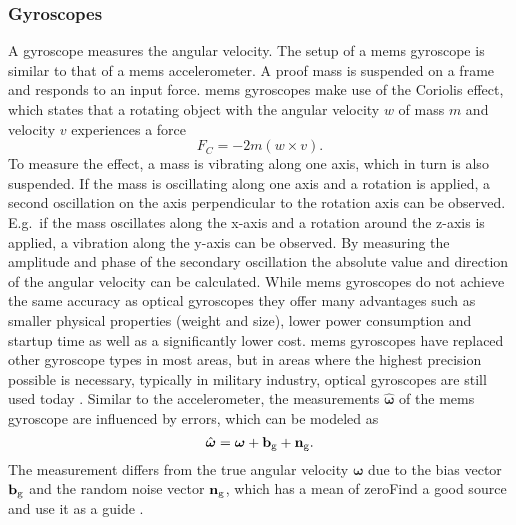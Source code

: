 \subsubsection{ Gyroscopes}
A gyroscope measures the angular velocity.
The setup of a \gls{mems} gyroscope is similar to that of a \gls{mems} accelerometer.
A proof mass is suspended on a frame and responds to an input force.
\gls{mems} gyroscopes make use of the Coriolis effect, which states that a rotating object with the angular velocity $w$ of mass $m$ and velocity $v$ experiences a force
\begin{equation}
    F_C = -2m(w\times v).
\end{equation}
To measure the effect, a mass is vibrating along one axis, which in turn is also suspended.
If the mass is oscillating along one axis and a rotation is applied, a second oscillation on the axis perpendicular to the rotation axis can be observed.
E.g.\ if the mass oscillates along the x-axis and a rotation around the z-axis is applied, a vibration along the y-axis can be observed.
By measuring the amplitude and phase of the secondary oscillation the absolute value and direction of the angular velocity can be calculated.
While \gls{mems} gyroscopes do not achieve the same accuracy as optical gyroscopes they offer many advantages such as smaller physical properties (weight and size), lower power consumption and startup time as well as a significantly lower cost.
\gls{mems} gyroscopes have replaced other gyroscope types in most areas, but in areas where the highest precision possible is necessary, typically in military industry, optical gyroscopes are still used today \cite{Perlmutter2016}.
Similar to the accelerometer, the measurements $\hat{\boldsymbol{\omega}}$ of the \gls{mems} gyroscope are influenced by errors, which can be modeled as
\begin{equation}
    \hat{\boldsymbol{\omega}} = \boldsymbol{\omega} + \vb{b}_\mathrm{g} + \vb{n}_\mathrm{g}.
\end{equation}
The measurement differs from the true angular velocity $\boldsymbol{\omega}$ due to the bias vector $\vb{b}_\mathrm{g}$ and the random noise vector $\vb{n}_\mathrm{g}$, which has a mean of zeroFind a good source and use it as a guide \cite{Lefferts1982}.


